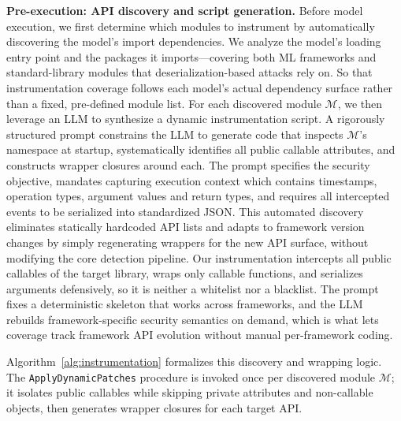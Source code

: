 \noindent \textbf{Pre-execution: API discovery and script generation.}
Before model execution, we first determine which modules to instrument by automatically discovering the model's import dependencies. We analyze the model's loading entry point and the packages it imports—covering both ML frameworks and standard-library modules that deserialization-based attacks rely on. So that instrumentation coverage follows each model's actual dependency surface rather than a fixed, pre-defined module list. For each discovered module $\mathcal{M}$, we then leverage an LLM to synthesize a dynamic instrumentation script. A rigorously structured prompt constrains the LLM to generate code that inspects $\mathcal{M}$'s namespace at startup, systematically identifies all public callable attributes, and constructs wrapper closures around each. The prompt specifies the security objective, mandates capturing execution context which contains timestamps, operation types, argument values and return types, and requires all intercepted events to be serialized into standardized JSON. This automated discovery eliminates statically hardcoded API lists and adapts to framework version changes by simply regenerating wrappers for the new API surface, without modifying the core detection pipeline. Our instrumentation intercepts all public callables of the target library, wraps only callable functions, and serializes arguments defensively, so it is neither a whitelist nor a blacklist. The prompt fixes a deterministic skeleton that works across frameworks, and the LLM rebuilds framework-specific security semantics on demand, which is what lets coverage track framework API evolution without manual per-framework coding.

Algorithm~\ref{alg:instrumentation} formalizes this discovery and wrapping logic. The \texttt{ApplyDynamicPatches} procedure is invoked once per discovered module $\mathcal{M}$; it isolates public callables while skipping private attributes and non-callable objects, then generates wrapper closures for each target API.

